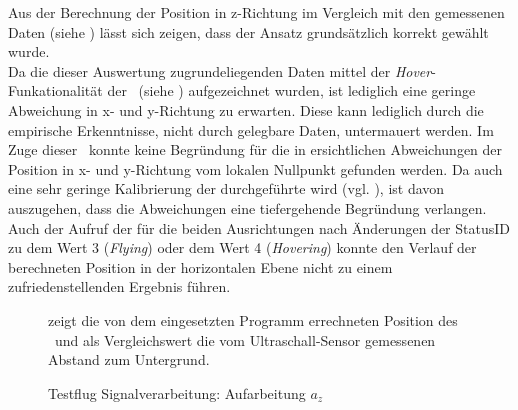 \FloatBarrier
{}


Aus der Berechnung der Position in z-Richtung im Vergleich mit den gemessenen Daten (siehe ) lässt sich zeigen, dass der Ansatz grundsätzlich korrekt gewählt wurde.\\
Da die dieser Auswertung zugrundeliegenden Daten mittel der \textit{Hover}-Funkationalität der \Ar\ (siehe ) aufgezeichnet wurden, ist lediglich eine geringe Abweichung in x- und y-Richtung zu erwarten. Diese kann lediglich durch die empirische Erkenntnisse, nicht durch gelegbare Daten, untermauert werden.
Im Zuge dieser \Arbeit\ konnte keine Begründung für die in  ersichtlichen Abweichungen der Position in x- und y-Richtung vom lokalen Nullpunkt gefunden werden. Da auch eine sehr geringe Kalibrierung der  durchgeführte wird (vgl. ), ist davon auszugehen, dass die Abweichungen eine tiefergehende Begründung verlangen. Auch der Aufruf der  für die beiden Ausrichtungen nach Änderungen der StatusID zu dem Wert 3 (\textit{Flying}) oder dem Wert 4 (\textit{Hovering}) konnte den Verlauf der berechneten Position in der horizontalen Ebene nicht zu einem zufriedenstellenden Ergebnis führen.

\begin{figure}[ht!]
\vspace{0.25cm}
\begin{center}
\caption{Testflug Signalverarbeitung: Aufarbeitung $a_z$}
\label{fig:FlightPos}
\end{center}

\vspace{0.25cm}
 zeigt die von dem eingesetzten Programm errechneten Position des \Quad[s] \Ar\ und als Vergleichswert die vom Ultraschall-Sensor gemessenen Abstand zum Untergrund.
\end{figure}


















